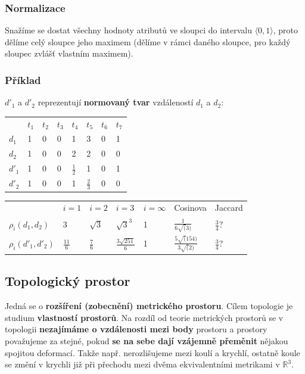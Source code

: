 \subsubsection{Normalizace}
Snažíme se dostat všechny hodnoty atributů ve sloupci do intervalu $\langle 0, 1\rangle$, proto dělíme celý sloupce jeho maximem (dělíme v rámci daného sloupce, pro každý sloupec zvlášť vlastním maximem).

\subsubsection*{Příklad}
$d'_1$ a $d'_2$ reprezentují \textbf{normovaný tvar} vzdáleností $d_1$ a $d_2$:
\begin{table}[H]
\centering
\begin{tabular}{l|lllllll}
	& $t_1$ &  $t_2$ & $t_3$ & $t_4$ &$t_5$  & $t_6$ &$t_7$  \\\hhline
	$d_1$&  1& 0 &0  &  1&3  &  0&1  \\
	$d_2$&  1&  0&  0&  2&  2& 0 & 0 \\
	$d'_1$&  1&  0&  0&  $\frac{1}{2}$& 1 &  0& 1 \\
	$d'_2$&  1&  0&  0&  1& $\frac{2}{3}$ &  0& 0
\end{tabular}
\end{table}
\begin{table}[H]
\centering
\begin{tabular}{l|l|l|l|l|l|l}
	& $i = 1$ &  $i = 2$ & $i = 3$ & $i = \infty$ &Cosinova  & Jaccard  \\\hhline
	$\rho_i(d_1, d_2)$&   3 &$\sqrt{3}$  &  $ \sqrt{3}^3 $&1 &  $\frac{1}{6 \sqrt(3)}$& $\frac{3}{4}?$ \\
	$\rho_i(d'_1, d'_2)$&   $\frac{11}{6}$&  $\frac{7}{6}$& $\frac{3 \sqrt{251}}{6}$&  1& $\frac{5 \sqrt(154)}{3 \sqrt(2)}$ & $\frac{3}{4}?$
\end{tabular}
\end{table}

\subsection{Topologický prostor}
Jedná se o \textbf{rozšíření (zobecnění) metrického prostoru}. Cílem topologie je studium \textbf{vlastností prostorů}. Na rozdíl od teorie metrických prostorů se v topologii \textbf{nezajímáme o vzdálenosti mezi body} prostoru a prostory považujeme za stejné, pokud \textbf{se na sebe dají vzájemně přeměnit} nějakou spojitou deformací. Takže např. nerozlišujeme mezi koulí a krychlí, ostatně koule se změní v krychli již při přechodu mezi dvěma ekvivalentními metrikami v $\mathbb{R}^3$.

